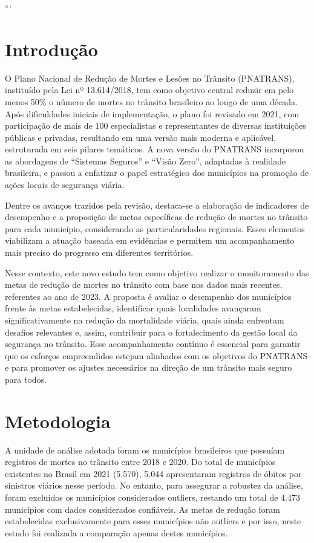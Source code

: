 \documentclass[
  letterpaper,
  DIV=11,
  numbers=noendperiod]{scrreprt}
\begin{document}
```


\chapter{Introdução}\label{introduuxe7uxe3o}

O Plano Nacional de Redução de Mortes e Lesões no Trânsito (PNATRANS),
instituído pela Lei nº 13.614/2018, tem como objetivo central reduzir em
pelo menos 50\% o número de mortes no trânsito brasileiro ao longo de
uma década. Após dificuldades iniciais de implementação, o plano foi
revisado em 2021, com participação de mais de 100 especialistas e
representantes de diversas instituições públicas e privadas, resultando
em uma versão mais moderna e aplicável, estruturada em seis pilares
temáticos. A nova versão do PNATRANS incorporou as abordagens de
``Sistemas Seguros'' e ``Visão Zero'', adaptadas à realidade brasileira,
e passou a enfatizar o papel estratégico dos municípios na promoção de
ações locais de segurança viária.

Dentre os avanços trazidos pela revisão, destaca-se a elaboração de
indicadores de desempenho e a proposição de metas específicas de redução
de mortes no trânsito para cada município, considerando as
particularidades regionais. Esses elementos viabilizam a atuação baseada
em evidências e permitem um acompanhamento mais preciso do progresso em
diferentes territórios.

Nesse contexto, este novo estudo tem como objetivo realizar o
monitoramento das metas de redução de mortes no trânsito com base nos
dados mais recentes, referentes ao ano de 2023. A proposta é avaliar o
desempenho dos municípios frente às metas estabelecidas, identificar
quais localidades avançaram significativamente na redução da mortalidade
viária, quais ainda enfrentam desafios relevantes e, assim, contribuir
para o fortalecimento da gestão local da segurança no trânsito. Esse
acompanhamento contínuo é essencial para garantir que os esforços
empreendidos estejam alinhados com os objetivos do PNATRANS e para
promover os ajustes necessários na direção de um trânsito mais seguro
para todos.


\chapter{Metodologia}\label{metodologia}

A unidade de análise adotada foram os municípios brasileiros que
possuíam registros de mortes no trânsito entre 2018 e 2020. Do total de
municípios existentes no Brasil em 2021 (5.570), 5.044 apresentaram
registros de óbitos por sinistros viários nesse período. No entanto,
para assegurar a robustez da análise, foram excluídos os municípios
considerados outliers, restando um total de 4.473 municípios com dados
considerados confiáveis. As metas de redução foram estabelecidas
exclusivamente para esses municípios não outliers e por isso, neste
estudo foi realizada a comparação apenas destes municípios.
\end{document}
